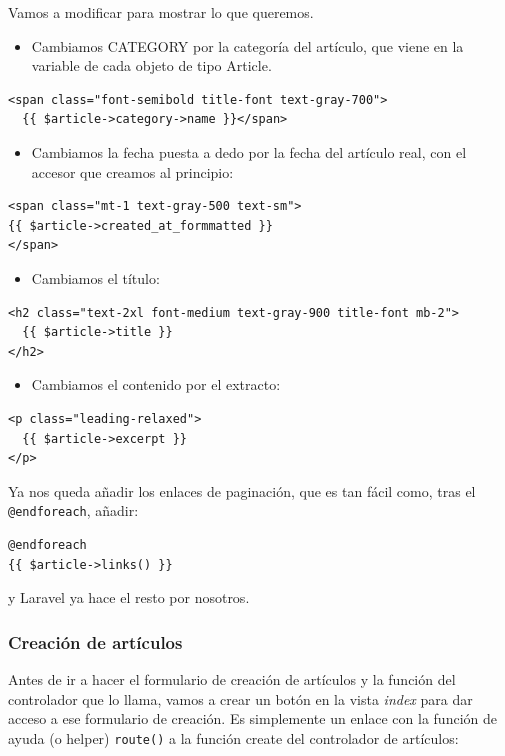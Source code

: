 \documentclass[11pt]{article}
\begin{document}
Vamos a modificar para mostrar lo que queremos.

\begin{itemize}
\item Cambiamos CATEGORY por la categoría del artículo, que viene en la
variable de cada objeto de tipo Article.
\end{itemize}
\begin{verbatim}
<span class="font-semibold title-font text-gray-700">
  {{ $article->category->name }}</span>
\end{verbatim}

\begin{itemize}
\item Cambiamos la fecha puesta a dedo por la fecha del artículo real, con
el accesor que creamos al principio:
\end{itemize}
\begin{verbatim}
<span class="mt-1 text-gray-500 text-sm">
{{ $article->created_at_formmatted }}
</span>
\end{verbatim}

\begin{itemize}
\item Cambiamos el título:
\end{itemize}
\begin{verbatim}
<h2 class="text-2xl font-medium text-gray-900 title-font mb-2">
  {{ $article->title }}
</h2>
\end{verbatim}

\begin{itemize}
\item Cambiamos el contenido por el extracto:
\end{itemize}
\begin{verbatim}
<p class="leading-relaxed">
  {{ $article->excerpt }}
</p>
\end{verbatim}

Ya nos queda añadir los enlaces de paginación, que es tan fácil como,
tras el \texttt{@endforeach}, añadir:
\begin{verbatim}
@endforeach
{{ $article->links() }}
\end{verbatim}
y Laravel ya hace el resto por nosotros.

\subsubsection{Creación de artículos}
\label{sec:orgaf09804}
Antes de ir a hacer el formulario de creación de artículos y la
función del controlador que lo llama, vamos a crear un botón en la
vista \emph{index} para dar acceso a ese formulario de creación. Es
simplemente un enlace con la función de ayuda (o helper) \texttt{route()} a
la función create del controlador de artículos:
\end{document}
